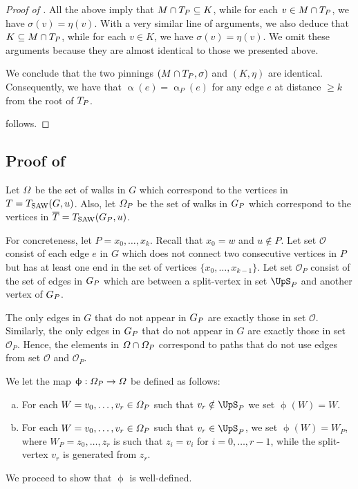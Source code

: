 \documentclass[11pt,reqno]{amsart}
\numberwithin{equation}{section}
\newcommand{\cO}{{\mathcal{O}}}
\newcommand{\blue}[1]{{\color{blue}#1}}
\newcommand{\bluepigment}[1]{{\color{blue(pigment)}#1}}
\newcommand{\bostonuniversityred}[1]{{\color{bostonuniversityred}#1}}
\newcommand{\capri}[1]{{\color{capri}#1}}
\newcommand{\cadmiumgreen}[1]{{\color{cadmiumgreen}#1}}
\newcommand{\electricviolet}[1]{{\color{electricviolet}#1}}
\newcommand{\goldenbrown}[1]{{\color{goldenbrown}#1}}
\newcommand{\heliotrope}[1]{{\color{heliotrope}#1}}
\newcommand{\iris}[1]{{\color{iris}#1}}
\newcommand{\red}[1]{{\color{red}#1}}
\newcommand{\Tsaw}{T_{\rm SAW}}
\renewcommand{\blue}[1]{#1}
\renewcommand{\bluepigment}[1]{#1}
\renewcommand{\bostonuniversityred}[1]{#1}
\renewcommand{\capri}[1]{#1}
\renewcommand{\cadmiumgreen}[1]{#1}
\renewcommand{\electricviolet}[1]{#1}
\renewcommand{\goldenbrown}[1]{#1}
\renewcommand{\heliotrope}[1]{#1}
\renewcommand{\iris}[1]{#1}
\renewcommand{\red}[1]{#1}
\newcommand{\ke}{\blue{e}}
\newcommand{\ki}{\capri{i}}
\newcommand{\kK}{\bluepigment{K}}
\newcommand{\kk}{\bluepigment{k}}
\newcommand{\kP}{\goldenbrown{P}}
\newcommand{\kr}{\bostonuniversityred{r}}%
\newcommand{\ku}{\red{u}}
\newcommand{\kv}{\electricviolet{v}}
\newcommand{\kW}{\blue{W}}
\newcommand{\kw}{\blue{w}}
\newcommand{\kx}{\heliotrope{x}}
\newcommand{\kz}{\cadmiumgreen{z}}
\renewcommand{\ke}{e}
\renewcommand{\ki}{i}
\renewcommand{\kK}{K}
\renewcommand{\kk}{k}
\renewcommand{\kP}{P}
\renewcommand{\kr}{r}
\renewcommand{\ku}{u}
\renewcommand{\kv}{v}
\renewcommand{\kW}{W}
\renewcommand{\kw}{w}
\renewcommand{\kx}{x}
\renewcommand{\kz}{z}
\newcommand{\infweight}{\upalpha}
\begin{document}
\begin{proof}[Proof of ]
All the above imply that $M\cap \XTPw \subseteq \kK$, while for each $\kv\in M\cap \XTPw$, we have $\sigma(\kv)=\eta(\kv)$. 
With a very similar line of arguments, we also deduce that $\kK \subseteq M\cap \XTPw$, while for each $\kv\in \kK$,
 we have  $\sigma(\kv)=\eta(\kv)$. We omit these arguments because they are almost identical to those we presented  above. 


We conclude that the two pinnings $(M\cap \XTPw,\sigma)$ and $(\kK,\eta)$ are identical. Consequently, we have that
$\infweight(\ke)=\infweight_{\kP}(\ke)$ for any edge $\ke$ at distance $\geq k$ from the root of  $\XTPw$. 

 follows. 
\end{proof}


\newcommand{\BBijection}{\iris{\upphi}}

\subsection{Proof of }\label{sec:lemma:Subtree4TSawU}


Let $\Omega$ be the set of walks in $G$ which correspond to the vertices in $\SMTu=\Tsaw(G,\ku)$. 
Also, let $\sawpaths_{\kP}$ be the set of walks in $\gext{G}{\kP}$ which correspond to the vertices in 
$\SMTPu=\Tsaw(\gext{G}{\kP},\ku)$. 



For concreteness, let $\kP=\kx_0, \ldots, \kx_{\kk}$.  Recall that $\kx_0=\kw$ and $\ku\notin \kP$.
%
Let set $\cO$ consist of each edge $\ke$ in $G$ 
which does not connect two consecutive vertices in $\kP$ but has at least one end in the set of vertices 
$\{\kx_{0}, \ldots, \kx_{\kk-1}\}$. Let set $\cO_{\kP}$ consist of the set of edges in $\gext{G}{\kP}$ which 
are between a split-vertex in set  $\ssplit_{\kP}$ and another vertex of $\gext{G}{\kP}$. 




The only edges in $G$ that do not appear in $\gext{G}{\kP}$ are exactly those in set $\cO$.
Similarly, the only edges in $\gext{G}{\kP}$ that do not appear in $G$ are exactly those in set $\cO_{\kP}$.
Hence, the elements in $\sawpaths \cap \sawpaths_{\kP}$ correspond to paths that do not use edges from
set $\cO$ and $\cO_{\kP}$. 



We let the map $\BBijection:\sawpaths_{\kP}\to \sawpaths$ be defined as follows: 
\begin{enumerate}[(a)]
\item For each   $\kW=\kv_0, \ldots, \kv_{\kr}\in \sawpaths_{\kP}$ such that $\kv_{\kr}\notin \ssplit_{\kP}$
 we set $\BBijection(\kW)=\kW$. 
 \item For each $\kW=\kv_0, \ldots, \kv_{\kr}\in \sawpaths_{\kP}$ such that $\kv_{\kr}\in \ssplit_{\kP}$, we set
$\BBijection(\kW)=\kW_{\kP}$, where $\kW_{\kP}=\kz_0, \ldots, \kz_{\kr}$ is such that $\kz_{\ki}=\kv_{\ki}$ for $\ki=0, \ldots, \kr-1$,  
while the split-vertex $\kv_{\kr}$ is generated from $\kz_{\kr}$. 
\end{enumerate}
We proceed to show that $\BBijection$ is well-defined. 
\end{document}
